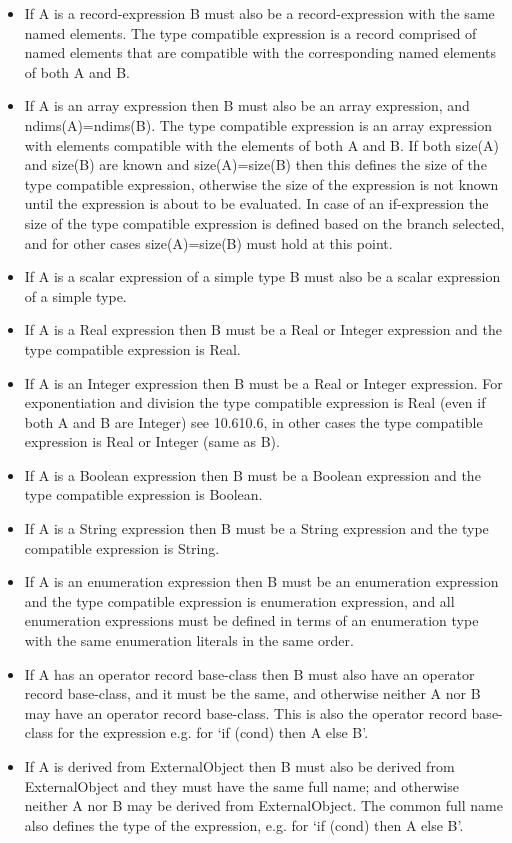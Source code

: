 \documentclass[10pt,a4paper]{report}
\begin{document}
\begin{itemize}
\item
  If A is a record-expression B must also be a record-expression with
  the same named elements. The type compatible expression is a record
  comprised of named elements that are compatible with the corresponding
  named elements of both A and B.
\item
  If A is an array expression then B must also be an array expression,
  and ndims(A)=ndims(B). The type compatible expression is an array
  expression with elements compatible with the elements of both A and B.
  If both size(A) and size(B) are known and size(A)=size(B) then this
  defines the size of the type compatible expression, otherwise the size
  of the expression is not known until the expression is about to be
  evaluated. In case of an if-expression the size of the type compatible
  expression is defined based on the branch selected, and for other
  cases size(A)=size(B) must hold at this point.
\item
  If A is a scalar expression of a simple type B must also be a scalar
  expression of a simple type.
\item
  If A is a Real expression then B must be a Real or Integer expression
  and the type compatible expression is Real.
\item
  If A is an Integer expression then B must be a Real or Integer
  expression. For exponentiation and division the type compatible
  expression is Real (even if both A and B are Integer) see 10.610.6, in
  other cases the type compatible expression is Real or Integer (same as
  B).
\item
  If A is a Boolean expression then B must be a Boolean expression and
  the type compatible expression is Boolean.
\item
  If A is a String expression then B must be a String expression and the
  type compatible expression is String.
\item
  If A is an enumeration expression then B must be an enumeration
  expression and the type compatible expression is enumeration
  expression, and all enumeration expressions must be defined in terms
  of an enumeration type with the same enumeration literals in the same
  order.
\item
  If A has an operator record base-class then B must also have an
  operator record base-class, and it must be the same, and otherwise
  neither A nor B may have an operator record base-class. This is also
  the operator record base-class for the expression e.g. for `if (cond)
  then A else B'.
\item
  If A is derived from ExternalObject then B must also be derived from
  ExternalObject and they must have the same full name; and otherwise
  neither A nor B may be derived from ExternalObject. The common full
  name also defines the type of the expression, e.g. for `if (cond) then
  A else B'.
\end{itemize}
\end{document}
